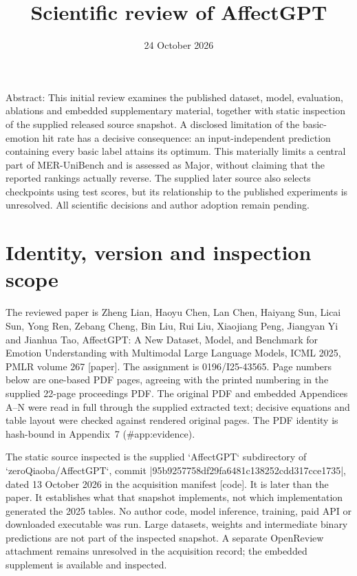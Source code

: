 \documentclass[10pt]{article}
\title{Scientific review of AffectGPT}
\author{}
\date{24 October 2026}
\begin{document}
\maketitle
Abstract: This initial review examines the published dataset, model, evaluation, ablations and embedded supplementary material, together with static inspection of the supplied released source snapshot. A disclosed limitation of the basic-emotion hit rate has a decisive consequence: an input-independent prediction containing every basic label attains its optimum. This materially limits a central part of MER-UniBench and is assessed as Major, without claiming that the reported rankings actually reverse. The supplied later source also selects checkpoints using test scores, but its relationship to the published experiments is unresolved. All scientific decisions and author adoption remain pending.\par
\section*{Identity, version and inspection scope}
The reviewed paper is Zheng Lian, Haoyu Chen, Lan Chen, Haiyang Sun, Licai Sun, Yong Ren, Zebang Cheng, Bin Liu, Rui Liu, Xiaojiang Peng, Jiangyan Yi and Jianhua Tao, AffectGPT: A New Dataset, Model, and Benchmark for Emotion Understanding with Multimodal Large Language Models, ICML 2025, PMLR volume 267 [paper]. The assignment is 0196/I25-43565. Page numbers below are one-based PDF pages, agreeing with the printed numbering in the supplied 22-page proceedings PDF. The original PDF and embedded Appendices A–N were read in full through the supplied extracted text; decisive equations and table layout were checked against rendered original pages. The PDF identity is hash-bound in Appendix 7 (\#app:evidence).\par
The static source inspected is the supplied `AffectGPT` subdirectory of `zeroQiaoba/AffectGPT`, commit |95b9257758df29fa6481c138252cdd317cce1735|, dated 13 October 2026 in the acquisition manifest [code]. It is later than the paper. It establishes what that snapshot implements, not which implementation generated the 2025 tables. No author code, model inference, training, paid API or downloaded executable was run. Large datasets, weights and intermediate binary predictions are not part of the inspected snapshot. A separate OpenReview attachment remains unresolved in the acquisition record; the embedded supplement is available and inspected.\par
\end{document}
